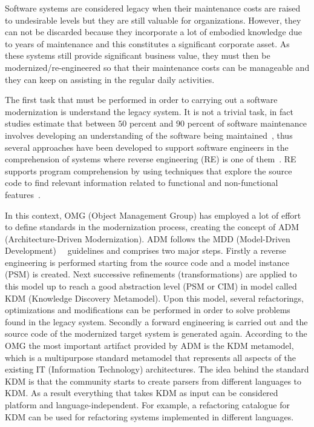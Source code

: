 \documentclass[a4paper,twoside]{article}
\begin{document}
\noindent Software systems are considered legacy when their maintenance costs are raised to undesirable levels but they are still valuable for organizations. However, they can not be discarded because they incorporate a lot of embodied knowledge due to years of maintenance and this constitutes a significant corporate asset. As these systems still provide significant business value, they must then be modernized/re-engineered so that their maintenance costs can be manageable and they can keep on assisting in the regular daily activities. 

The first task that must be performed in order to carrying out a software modernization is understand the legacy system. It is not a trivial task, in fact studies estimate that between $50$ percent and $90$ percent of software maintenance involves developing an understanding of the software being maintained~\cite{Tilley95perspectiveson}, thus several approaches have been developed to support software engineers in the comprehension of systems where reverse engineering (RE) is one of them~\cite{Canfora2011}. RE supports program comprehension by using techniques that explore the source code to find relevant information related to functional and non-functional features~\cite{chikofskyTax}.

In this context, OMG (Object Management Group) has employed a lot of effort to define standards in the modernization process, creating the concept of ADM (Architecture-Driven Modernization). ADM follows the MDD (Model-Driven Development)~\cite{Ulrich:2010:IST:1841736}~\cite{5440163} guidelines and comprises two major steps. Firstly a reverse engineering is performed starting from the source code and a model instance (PSM) is created. Next successive refinements (transformations) are applied to this model up to reach a good abstraction level (PSM or CIM) in model called KDM (Knowledge Discovery Metamodel). Upon this model, several refactorings, optimizations and modifications can be performed in order to solve problems found in the legacy system. Secondly a forward engineering is carried out and the source code of the modernized target system is generated again. According to the OMG the most important artifact provided by ADM is the KDM metamodel, which is a multipurpose standard metamodel that represents all aspects of the existing IT (Information  Technology) architectures. The idea behind the standard KDM is that the community starts to create parsers from different languages to KDM. As a result everything that takes KDM as input can be considered platform and language-independent. For example, a refactoring catalogue for KDM can be used for refactoring systems implemented in different languages. 
\end{document}
